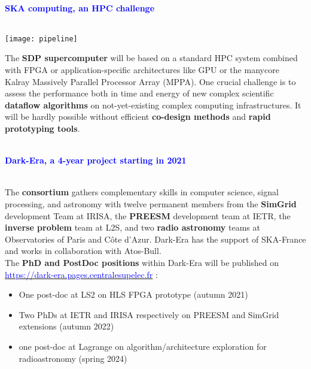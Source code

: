 \documentclass{beamer}
\renewenvironment{block}[1]{%
\begin{Sbox}%
\begin{minipage}[t]{\textwidth}
~\\
\textcolor{blue}{\quad #1}~\\
~\\%
\vspace{0.5cm}
} 
{%
\end{minipage}
\end{Sbox}\Ovalbox{\TheSbox}%
}
\begin{document}
{\begin{columns}[t]
\begin{column}{.49\linewidth}
\begin{block}{\large \textbf{SKA computing, an HPC challenge}}
\begin{minipage}{0.95\textwidth}
\begin{center}
    \texttt{[image: pipeline]} %
    \end{center}

The \textbf{SDP supercomputer} will be based on a standard HPC system combined with FPGA or application-specific architectures like GPU or the manycore Kalray Massively Parallel Processor Array (MPPA). One crucial challenge is to assess the performance both in time and energy of new complex scientific \textbf{dataflow algorithms} on not-yet-existing complex computing infrastructures. It will be hardly possible without efficient \textbf{co-design methods} and \textbf{rapid prototyping tools}.
\end{minipage}
\end{block}

\begin{block}{\large \textbf{Dark-Era, a 4-year project starting in 2021}}
 \begin{minipage}{0.95\textwidth}
The \textbf{consortium} gathers complementary skills in computer science, signal processing, and astronomy with twelve permanent members from the \textbf{SimGrid} \cite{casanova:hal-01017319} development Team at IRISA, the \textbf{PREESM} \cite{preesm} development team at IETR, the \textbf{inverse problem} team at L2S, and two \textbf{radio astronomy} teams at Observatories of Paris and Côte d’Azur. Dark-Era has the support of SKA-France and works in collaboration with Atos-Bull.\\

The \textbf{PhD and PostDoc positions} within Dark-Era will be published on \href{https://dark-era.pages.centralesupelec.fr}{\textcolor{blue}{https://dark-era.pages.centralesupelec.fr}} :
\begin{itemize}
    \item One post-doc at LS2 on HLS FPGA prototype (autumn 2021)
    \item Two PhDs at IETR and IRISA respectively on PREESM and SimGrid
    extensions (autumn 2022)
    \item one post-doc at Lagrange on algorithm/architecture exploration for radioastronomy (spring 2024)
\end{itemize}
 \end{minipage}
\end{block}


\end{column}
\end{columns}}
\end{document}
